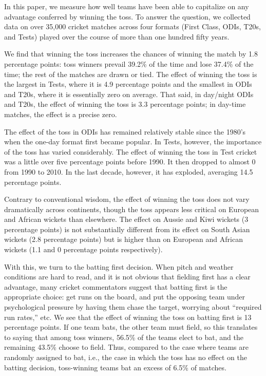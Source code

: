 \documentclass[11pt,  letterpaper]{article}
\begin{document}
In this paper, we measure how well teams have been able to capitalize on any advantage conferred by winning the toss. To answer the question, we collected data on over 35,000 cricket matches across four formats (First Class, ODIs, T20s, and Tests) played over the course of more than one hundred fifty years.

We find that winning the toss increases the chances of winning the match by 1.8 percentage points: toss winners prevail 39.2\% of the time and lose 37.4\% of the time; the rest of the matches are drawn or tied. The effect of winning the toss is the largest in Tests, where it is 4.9 percentage points and the smallest in ODIs and T20s, where it is essentially zero on average. That said, in day/night ODIs and T20s, the effect of winning the toss is 3.3 percentage points; in day-time matches, the effect is a precise zero.

The effect of the toss in ODIs has remained relatively stable since the 1980's when the one-day format first became popular. In Tests, however, the importance of the toss has varied considerably. The effect of winning the toss in Test cricket was a little over five percentage points before 1990. It then dropped to almost 0 from 1990 to 2010. In the last decade, however, it has exploded, averaging 14.5 percentage points. 

Contrary to conventional wisdom, the effect of winning the toss does not vary dramatically across continents, though the toss appears less critical on European and African wickets than elsewhere. The effect on Aussie and Kiwi wickets (3 percentage points) is not substantially different from its effect on South Asian wickets (2.8 percentage points) but is higher than on European and African wickets (1.1 and 0 percentage points respectively).

With this, we turn to the batting first decision. When pitch and weather conditions are hard to read, and it is not obvious that fielding first has a clear advantage, many cricket commentators suggest that batting first is the appropriate choice: get runs on the board, and put the opposing team under psychological pressure by having them chase the target, worrying about ``required run rates,'' etc. We see that the effect of winning the toss on batting first is 13 percentage points. If one team bats, the other team must field, so this translates to saying that among toss winners, 56.5\% of the teams elect to bat, and the remaining 43.5\% choose to field. Thus, compared to the case where teams are randomly assigned to bat, i.e., the case in which the toss has no effect on the batting decision, toss-winning teams bat an excess of 6.5\% of matches. 
\end{document}

